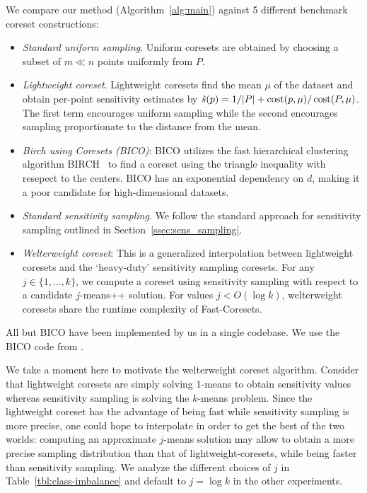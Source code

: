 We compare our method (Algorithm~\ref{alg:main}) against 5 different benchmark coreset constructions:
\begin{itemize}
        \item \emph{Standard uniform sampling}. Uniform coresets are obtained by choosing a subset of $m \ll n$ points uniformly from $P$.
        \item \emph{Lightweight coreset}. Lightweight coresets find the mean $\mu$ of the dataset and obtain per-point sensitivity estimates by $\hat{s}(p) = 1/|P| + \operatorname{cost}(p, \mu) / \operatorname{cost}(P, \mu)$.
            The first term encourages uniform sampling while the second encourages sampling proportionate to the distance from the mean.
        \item \emph{Birch using Coresets (BICO)}: BICO utilizes the fast hierarchical clustering algorithm BIRCH~\cite{birch} to find a coreset using the
            triangle inequality with resepect to the centers. BICO has an exponential dependency on $d$, making it a poor candidate for high-dimensional datasets.
        \item \emph{Standard sensitivity sampling}. We follow the standard approach for sensitivity sampling outlined in Section~\ref{ssec:sens_sampling}.
        \item \emph{Welterweight coreset}: This is a generalized interpolation between lightweight coresets and the `heavy-duty' sensitivity sampling coresets. For any $j
            \in \{1,..., k\}$, we compute a coreset using sensitivity sampling with respect to a candidate $j$-means++ solution. For values $j < O(\log k)$,
            welterweight coresets share the runtime complexity of Fast-Coresets.
\end{itemize}
All but BICO have been implemented by us in a single codebase. We use the BICO code from \cite{bico}.

We take a moment here to motivate the welterweight coreset algorithm.  Consider that lightweight coresets are simply solving $1$-means to obtain sensitivity
values whereas sensitivity sampling is solving the $k$-means problem. Since the lightweight coreset has the advantage of being fast while sensitivity sampling
is more precise, one could hope to interpolate in order to get the best of the two worlds: computing an approximate $j$-means solution may allow to obtain
a more precise sampling distribution than that of lightweight-coresets, while being faster than sensitivity sampling. We analyze the different choices of $j$ in
Table~\ref{tbl:class-imbalance} and default to $j = \log k$ in the other experiments.

